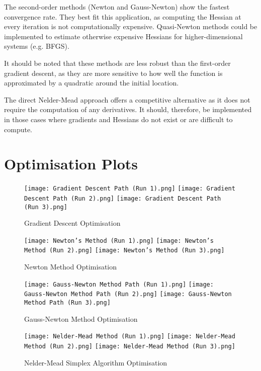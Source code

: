 \documentclass[hidelinks]{article}
\begin{document}
The second-order methods (Newton and Gauss-Newton) show the fastest convergence rate. They best fit this application, as computing the Hessian at every iteration is not computationally expensive. Quasi-Newton methods could be implemented to estimate otherwise expensive Hessians for higher-dimensional systems (e.g. BFGS).
\par It should be noted that these methods are less robust than the first-order gradient descent, as they are more sensitive to how well the function is approximated by a quadratic around the initial location.
\par The direct Nelder-Mead approach offers a competitive alternative as it does not require the computation of any derivatives. It should, therefore, be implemented in those cases where gradients and Hessians do not exist or are difficult to compute.
%
\appendix{} 
\section{Optimisation Plots} \label{appendix:A}
%
\begin{figure}[h!]

\centering
\texttt{[image: Gradient Descent Path (Run 1).png]}\hfill
\texttt{[image: Gradient Descent Path (Run 2).png]}\hfill
\texttt{[image: Gradient Descent Path (Run 3).png]}

\caption{Gradient Descent Optimisation}
\label{fig:gradientDescent}

\end{figure}
%
\begin{figure}[h!]

\centering
\texttt{[image: Newton's Method (Run 1).png]}\hfill
\texttt{[image: Newton's Method (Run 2).png]}\hfill
\texttt{[image: Newton's Method (Run 3).png]}

\caption{Newton Method Optimisation}
\label{fig:newtonMethod}

\end{figure}
%
\begin{figure}[h!]

\centering
\texttt{[image: Gauss-Newton Method Path (Run 1).png]}\hfill
\texttt{[image: Gauss-Newton Method Path (Run 2).png]}\hfill
\texttt{[image: Gauss-Newton Method Path (Run 3).png]}

\caption{Gauss-Newton Method Optimisation}
\label{fig:gaussNewton}

\end{figure}
%
\begin{figure}[h!]

\centering
\texttt{[image: Nelder-Mead Method (Run 1).png]}\hfill
\texttt{[image: Nelder-Mead Method (Run 2).png]}\hfill
\texttt{[image: Nelder-Mead Method (Run 3).png]}

\caption{Nelder-Mead Simplex Algorithm Optimisation}
\label{fig:nelderMead}

\end{figure}
%
\end{document}
